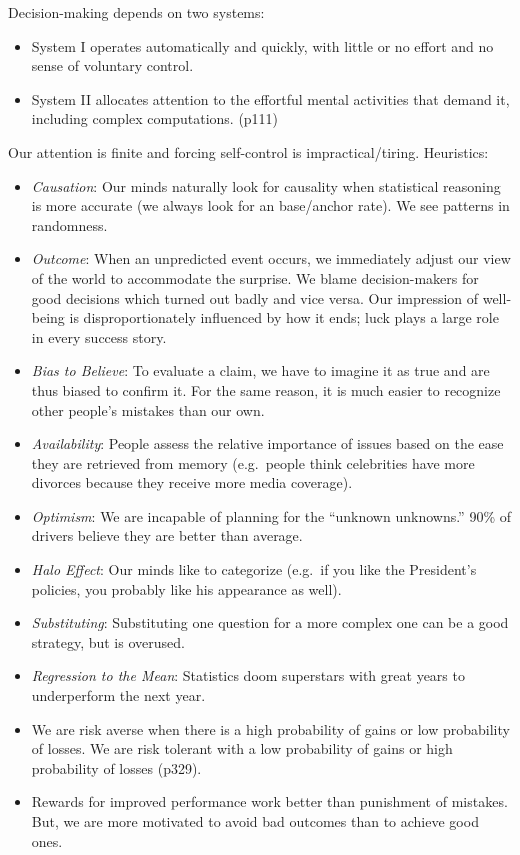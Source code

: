 \documentclass[
]{article}
\begin{document}
Decision-making depends on two systems:

\begin{itemize}
\item
  System I operates automatically and quickly, with little or no effort
  and no sense of voluntary control.
\item
  System II allocates attention to the effortful mental activities that
  demand it, including complex computations. (p111)
\end{itemize}

Our attention is finite and forcing self-control is impractical/tiring.
Heuristics:

\begin{itemize}
\item
  \emph{Causation}: Our minds naturally look for causality when
  statistical reasoning is more accurate (we always look for an
  base/anchor rate). We see patterns in randomness.
\item
  \emph{Outcome}: When an unpredicted event occurs, we immediately
  adjust our view of the world to accommodate the surprise. We blame
  decision-makers for good decisions which turned out badly and vice
  versa. Our impression of well-being is disproportionately influenced
  by how it ends; luck plays a large role in every success story.
\item
  \emph{Bias to Believe}: To evaluate a claim, we have to imagine it as
  true and are thus biased to confirm it. For the same reason, it is
  much easier to recognize other people's mistakes than our own.
\item
  \emph{Availability}: People assess the relative importance of issues
  based on the ease they are retrieved from memory (e.g.~people think
  celebrities have more divorces because they receive more media
  coverage).
\item
  \emph{Optimism}: We are incapable of planning for the ``unknown
  unknowns.'' 90\% of drivers believe they are better than average.
\item
  \emph{Halo Effect}: Our minds like to categorize (e.g.~if you like the
  President's policies, you probably like his appearance as well).
\item
  \emph{Substituting}: Substituting one question for a more complex one
  can be a good strategy, but is overused.
\item
  \emph{Regression to the Mean}: Statistics doom superstars with great
  years to underperform the next year.
\item
  We are risk averse when there is a high probability of gains or low
  probability of losses. We are risk tolerant with a low probability of
  gains or high probability of losses (p329).
\item
  Rewards for improved performance work better than punishment of
  mistakes. But, we are more motivated to avoid bad outcomes than to
  achieve good ones.
\end{itemize}
\end{document}
